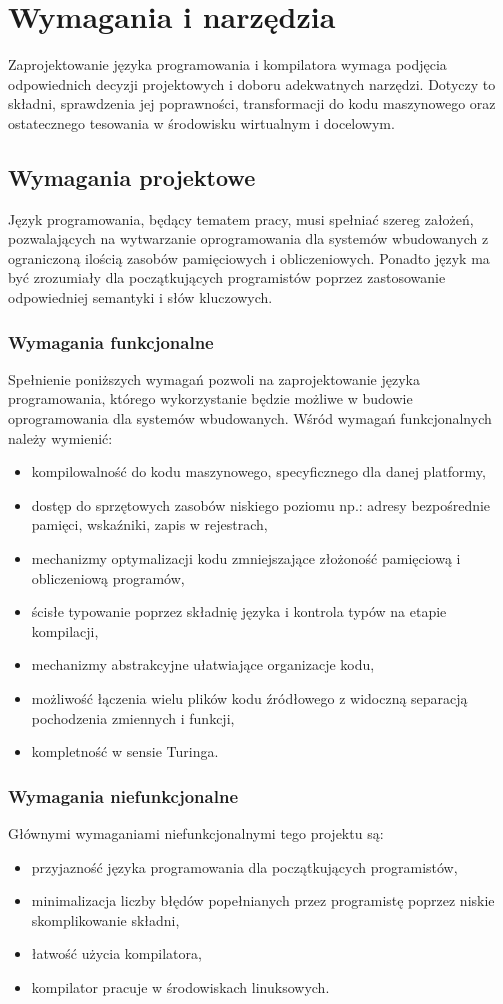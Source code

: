 \chapter{Wymagania i narzędzia}
\label{ch:03}

Zaprojektowanie języka programowania i kompilatora wymaga podjęcia odpowiednich decyzji projektowych i doboru adekwatnych narzędzi. Dotyczy to składni, sprawdzenia jej poprawności, transformacji do kodu maszynowego oraz ostatecznego tesowania w środowisku wirtualnym i docelowym.
\section{Wymagania projektowe}

Język programowania, będący tematem pracy, musi spełniać szereg założeń, pozwalających na wytwarzanie oprogramowania dla systemów wbudowanych z ograniczoną ilością zasobów pamięciowych i obliczeniowych. Ponadto język ma być zrozumiały dla początkujących programistów poprzez zastosowanie odpowiedniej semantyki i słów kluczowych.

\subsection{Wymagania funkcjonalne}
Spełnienie poniższych wymagań pozwoli na zaprojektowanie języka programowania, którego wykorzystanie będzie możliwe w budowie oprogramowania dla systemów wbudowanych. Wśród wymagań funkcjonalnych należy wymienić:
\begin{itemize}
\item kompilowalność do kodu maszynowego, specyficznego dla danej platformy,
\item dostęp do sprzętowych zasobów niskiego poziomu np.: adresy bezpośrednie pamięci, wskaźniki, zapis w rejestrach,
\item mechanizmy optymalizacji kodu zmniejszające złożoność pamięciową i obliczeniową programów,
\item ścisłe typowanie poprzez składnię języka i kontrola typów na etapie kompilacji,
\item mechanizmy abstrakcyjne ułatwiające organizacje kodu,
\item możliwość łączenia wielu plików kodu źródłowego z widoczną separacją pochodzenia zmiennych i funkcji,
\item kompletność w sensie Turinga.
\end{itemize}

\subsection{Wymagania niefunkcjonalne}
Głównymi wymaganiami niefunkcjonalnymi tego projektu są:
\begin{itemize}
\item przyjazność języka programowania dla początkujących programistów,
\item minimalizacja liczby błędów popełnianych przez programistę poprzez niskie skomplikowanie składni,
\item łatwość użycia kompilatora,
\item kompilator pracuje w środowiskach linuksowych.
\end{itemize}

